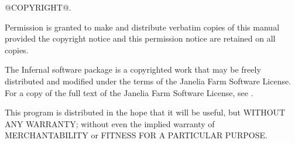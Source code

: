 \vspace*{\fill}
\begin{flushleft}
@COPYRIGHT@.\vspace{5mm}

Permission is granted to make and distribute verbatim copies of this
manual provided the copyright notice and this permission notice are
retained on all copies.\vspace{5mm}

The Infernal software package is a copyrighted work that may be freely
distributed and modified under the terms of the Janelia Farm Software
License. For a copy of the full text of the Janelia Farm Software
License, see
.
\vspace{5mm}

This program is distributed in the hope that it will be useful, but
WITHOUT ANY WARRANTY; without even the implied warranty of
MERCHANTABILITY or FITNESS FOR A PARTICULAR PURPOSE.\vspace{5mm}

\end{flushleft}
